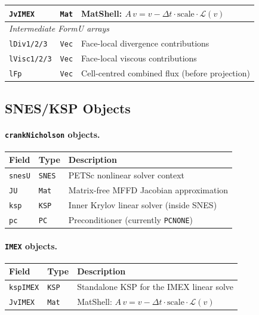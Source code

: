 \documentclass[12pt,a4paper]{article}
\newcommand{\cL}{\mathcal{L}}
\newcommand{\dt}{\Delta t}
\begin{document}
\begin{center}
\begin{tabular}{lll}
			\texttt{JvIMEX} & \texttt{Mat} & MatShell: $A\,v = v - \dt\cdot\text{scale}\cdot\cL(v)$ \\
			\midrule
			\multicolumn{3}{l}{\emph{Intermediate FormU arrays}} \\
			\texttt{lDiv1/2/3} & \texttt{Vec} & Face-local divergence contributions \\
			\texttt{lVisc1/2/3} & \texttt{Vec} & Face-local viscous contributions \\
			\texttt{lFp} & \texttt{Vec} & Cell-centred combined flux (before projection) \\
			\bottomrule
		\end{tabular}
	\end{center}
	
	\subsection{SNES/KSP Objects}

	\paragraph{\texttt{crankNicholson} objects.}
	\begin{center}
		\begin{tabular}{lll}
			\toprule
			Field & Type & Description \\
			\midrule
			\texttt{snesU} & \texttt{SNES} & PETSc nonlinear solver context \\
			\texttt{JU} & \texttt{Mat} & Matrix-free MFFD Jacobian approximation \\
			\texttt{ksp} & \texttt{KSP} & Inner Krylov linear solver (inside SNES) \\
			\texttt{pc} & \texttt{PC} & Preconditioner (currently \texttt{PCNONE}) \\
			\bottomrule
		\end{tabular}
	\end{center}

	\paragraph{\texttt{IMEX} objects.}
	\begin{center}
		\begin{tabular}{lll}
			\toprule
			Field & Type & Description \\
			\midrule
			\texttt{kspIMEX} & \texttt{KSP} & Standalone KSP for the IMEX linear solve \\
			\texttt{JvIMEX} & \texttt{Mat} & MatShell: $A\,v = v - \dt\cdot\text{scale}\cdot\cL(v)$ \\
			\bottomrule
		\end{tabular}
	\end{center}
\end{document}
